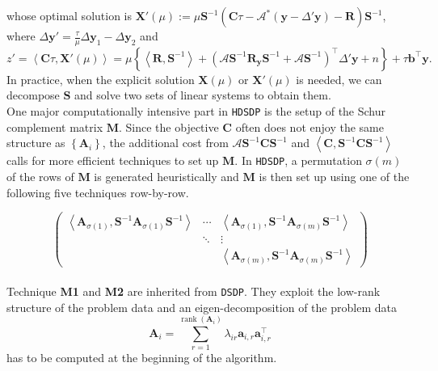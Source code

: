whose optimal solution is $\mathbf{X}' (\mu) := \mu \mathbf{S}^{- 1} \left( \mathbf{C} \tau -
\mathcal{A}^{\ast} \left( \mathbf{y} - \Delta' \mathbf{y} \right) - \mathbf{R} \right) \mathbf{S}^{- 1}$, where
$\Delta \mathbf{y}' = \frac{\tau}{\mu} \Delta \mathbf{y}_1 - \Delta \mathbf{y}_2$ and
\[ z' = \left\langle \mathbf{C} \tau, \mathbf{X}' (\mu) \right\rangle = \mu \left\{
   \left\langle \mathbf{R}, \mathbf{S}^{- 1} \right\rangle + \left( \mathcal{A} \mathbf{S}^{- 1} \mathbf{R}_{\mathbf{y}}
   \mathbf{S}^{- 1} + \mathcal{A} \mathbf{S}^{- 1} \right)^{\top} \Delta' \mathbf{y} + n \right\} + \tau
   \mathbf{b}^{\top} \mathbf{y} . \]
In practice, when the explicit solution $\mathbf{X} (\mu)$ or $\mathbf{X}' (\mu)$ is needed,
we can decompose $\mathbf{S}$ and solve two sets of linear systems to obtain them.\\

One major computationally intensive part in {{\texttt{HDSDP}}} is the setup of
the Schur complement matrix $\mathbf{M}$. Since the objective $\mathbf{C}$ often does not
enjoy the same structure as $\left\{ \mathbf{A}_i \right\}$, the additional cost from
$\mathcal{A} \mathbf{S}^{- 1} \mathbf{C} \mathbf{S}^{- 1}$ and $\left\langle \mathbf{C}, \mathbf{S}^{- 1} \mathbf{C} \mathbf{S}^{- 1}
\right\rangle$ calls for more efficient techniques to set up $\mathbf{M}$. In
{{\texttt{HDSDP}}}, a permutation $\sigma (m)$ of the rows of $\mathbf{M}$ is
generated heuristically and $\mathbf{M}$ is then set up using one of the following five
techniques row-by-row.

\[ \left(\begin{array}{ccc}
     \left\langle \mathbf{A}_{\sigma (1)}, \mathbf{S}^{- 1} \mathbf{A}_{\sigma (1)} \mathbf{S}^{- 1}
     \right\rangle & \cdots & \left\langle \mathbf{A}_{\sigma (1)}, \mathbf{S}^{- 1}
     \mathbf{A}_{\sigma (m)} \mathbf{S}^{- 1} \right\rangle\\
     & \ddots & \vdots\\
     &  & \left\langle \mathbf{A}_{\sigma (m)}, \mathbf{S}^{- 1} \mathbf{A}_{\sigma (m)} \mathbf{S}^{- 1}
     \right\rangle
   \end{array}\right) \]\\
   
Technique {\textbf{M1}} and {\textbf{M2}} are inherited from
{{\texttt{DSDP}}}. They exploit the low-rank structure of the problem data and
an eigen-decomposition of the problem data
\[ \mathbf{A}_i = \sum_{r = 1}^{\ensuremath{\operatorname{rank}} \left( \mathbf{A}_i \right)} \lambda_{i r}
   \mathbf{a}_{i, r} \mathbf{a}^{\top}_{i, r} \]
has to be computed at the beginning of the algorithm.\\


